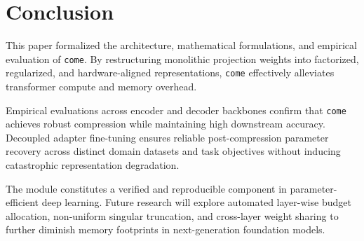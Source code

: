 \section{Conclusion}
This paper formalized the architecture, mathematical formulations, and empirical evaluation of \texttt{come}. By restructuring monolithic projection weights into factorized, regularized, and hardware-aligned representations, \texttt{come} effectively alleviates transformer compute and memory overhead.

Empirical evaluations across encoder and decoder backbones confirm that \texttt{come} achieves robust compression while maintaining high downstream accuracy. Decoupled adapter fine-tuning ensures reliable post-compression parameter recovery across distinct domain datasets and task objectives without inducing catastrophic representation degradation.

The module constitutes a verified and reproducible component in parameter-efficient deep learning. Future research will explore automated layer-wise budget allocation, non-uniform singular truncation, and cross-layer weight sharing to further diminish memory footprints in next-generation foundation models.
